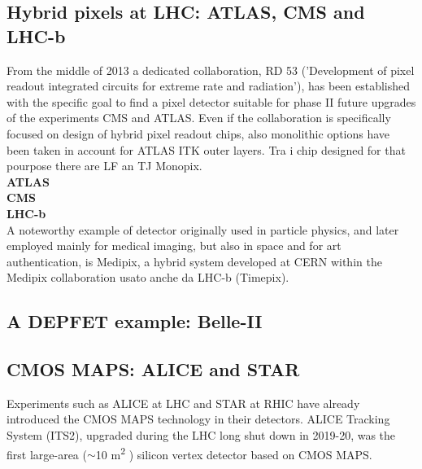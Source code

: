     \subsection{Hybrid pixels at LHC: ATLAS, CMS and LHC-b}
        From the middle of 2013 a dedicated collaboration, RD 53 ('Development of pixel readout integrated circuits for extreme rate and radiation'), has been established with the specific goal to find a pixel detector suitable for phase II future upgrades of the experiments CMS and ATLAS. Even if the collaboration is specifically focused on design of hybrid pixel readout chips, also monolithic options have been taken in account for ATLAS ITK outer layers. Tra i chip designed for that pourpose there are LF an TJ Monopix.\\
        \textbf{ATLAS}\\
        \textbf{CMS}\\
        \textbf{LHC-b} \\
        A noteworthy example of detector originally used in particle physics, and later employed mainly for medical imaging, but also in space and for art authentication, is Medipix, a hybrid system developed at CERN within the Medipix collaboration usato anche da LHC-b (Timepix).\\

    \subsection{A DEPFET example: Belle-II}
        

    \subsection{CMOS MAPS: ALICE and STAR}
        Experiments such as ALICE at LHC and STAR at RHIC have already introduced the CMOS MAPS technology in their detectors. ALICE Tracking System (ITS2), upgraded during the LHC long shut down in 2019-20, was the first large-area ($\sim$10 \si{m\squared} ) silicon vertex detector based on CMOS MAPS.

